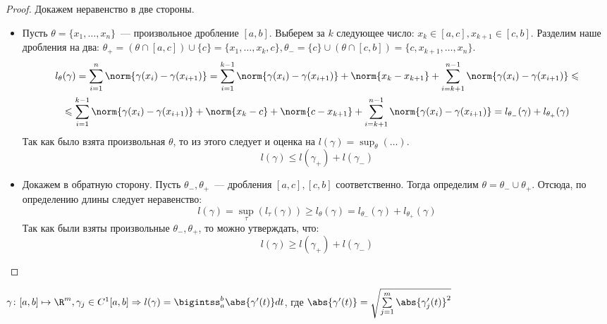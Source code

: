 \begin{proof}
    Докажем неравенство в две стороны.
    \begin{itemize}
        \item
        Пусть $\theta = \{x_1,\dots, x_n\}$~--- произвольное дробление $[a,b]$.
        Выберем за $k$ следующее число: $x_k \in [a,c], x_{k + 1}\in [c,b]$.
        Разделим наше дробления на два:
        $\theta_+ = (\theta \cap [a,c]) \cup \{c\} = \{x_1,\dots,x_k, c\},
        \theta_- = \{c\} \cup (\theta \cap [c, b]) = \{c, x_{k+1},\dots, x_n\}$.
        \[
            \begin{gathered}
                l_{\theta}(\gamma) =
                \sum\limits_{i=1}^{n}\norm{\gamma(x_i) - \gamma(x_{i + 1})}=
                \sum\limits_{i=1}^{k-1}\norm{\gamma(x_i) - \gamma(x_{i + 1})} + \norm{x_k - x_{k+1}} +
                \sum\limits_{i=k+1}^{n-1}\norm{\gamma(x_i) - \gamma(x_{i + 1})} \leqslant\\
                \leqslant \sum\limits_{i=1}^{k-1}\norm{\gamma(x_i) - \gamma(x_{i + 1})}
                + \norm{x_k - c} + \norm{c - x_{k + 1}} +
                \sum\limits_{i=k+1}^{n-1}\norm{\gamma(x_i) - \gamma(x_{i + 1})}=
                l_{\theta_-}(\gamma) + l_{\theta_+}(\gamma)
            \end{gathered}
        \] 
        Так как было взята произвольная $\theta$, то из этого следует и оценка на $l(\gamma) = \sup_\theta(\dots)$.
        \[
            l(\gamma) \le l(\gamma_+) + l(\gamma_-)
        \] 
        \item
        Докажем в обратную сторону.
        Пусть $\theta_-, \theta_+$~--- дробления $[a,c], [c, b]$ соответственно.
        Тогда определим $\theta = \theta_- \cup \theta_+$. Отсюда, по определению длины следует неравенство:
         \[
             l(\gamma) = \sup_{\tau}(l_{\tau}(\gamma)) \ge l_{\theta}(\gamma) = l_{\theta_-}(\gamma) + l_{\theta_+}(\gamma)
        \] 
        Так как были взяты произвольные $\theta_-, \theta_+$, то можно утверждать, что:
         \[
             l(\gamma) \ge l(\gamma_+) + l(\gamma_-)
        \] 
    \end{itemize}
\end{proof}
\begin{theorem}
    $\gamma\colon[a,b]\mapsto\R^m, \gamma_j\in C^1[a,b] \Rightarrow 
    l(\gamma)=\bigintss_{a}^{b}\abs{\gamma'(t)}dt$, где
    $\abs{\gamma'(t)} = \sqrt{\sum\limits_{j=1}^{m}{\abs{\gamma'_j(t)}}^2}$
\end{theorem}
